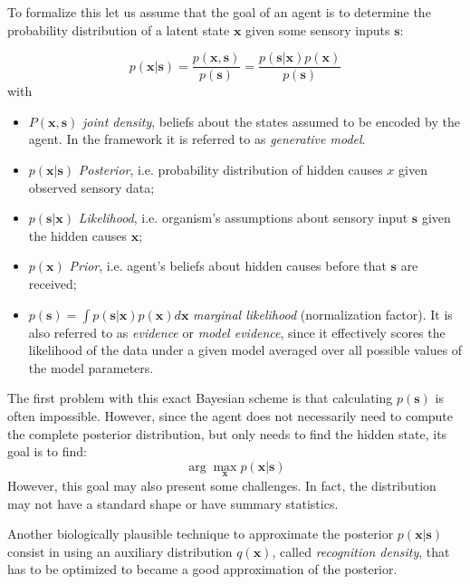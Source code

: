 \documentclass[10pt]{article}
\begin{document}
To formalize this let us assume that the goal of an agent is to determine the probability distribution of a latent state $\bm{x}$ given some sensory inputs $\bm{s}$:

\begin{equation}
p(\bm{x}|\bm{s}) = \frac{p(\bm{x},\bm{s})}{p(\bm{s})} = \frac{p(\bm{s}|\bm{x})p(\bm{x})}{p(\bm{s})}
\end{equation}
with
\begin{itemize}

\item $P(\bm{x},\bm{s})$ \emph{joint density}, beliefs about the states assumed to be encoded by the agent. In the framework it is referred to as \emph{generative model}.

\item $p(\bm{x}|\bm{s})$ \emph{Posterior}, i.e. probability distribution of hidden causes $x$ given observed sensory data; 

\item $p(\bm{s}|\bm{x})$ \emph{Likelihood}, i.e. organism's assumptions about sensory input $\bm{s}$ given the hidden causes $\bm{x}$;

\item $p(\bm{x})$ \emph{Prior}, i.e. agent's beliefs about hidden causes before that $\bm s$ are received;

\item $p(\bm s)=\int p(\bm s|\bm x)p(\bm x) d\bm x $ \emph{marginal likelihood} (normalization factor). It is also referred to as \emph{evidence} or \emph{model evidence}, since it effectively scores the likelihood of the data under a given model averaged over all possible values of the model parameters.

\end{itemize}

The first problem with this exact Bayesian scheme is that calculating $p(\bm s)$ is often impossible. However, since the agent does not necessarily need to compute the complete posterior distribution, but only needs to find the hidden state, its goal is to find:
\begin{equation}
    \arg \max_{\bm{x}} p(\bm x|\bm s)
\end{equation}
However, this goal may also present some challenges. In fact, the distribution may not have a standard shape or have summary statistics. 

Another biologically plausible technique to approximate the posterior $p(\bm x | \bm s)$ consist in using an auxiliary distribution $q(\bm x)$, called \emph{recognition density}, that has to be optimized to became a good approximation of the posterior.  
\end{document}
